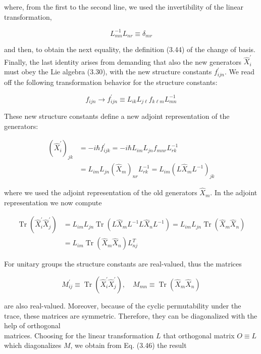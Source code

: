 \documentclass[10pt, letterpaper]{article}
\begin{document}
where, from the first to the second line, we used the invertibility of the linear transformation,

$$
L_{m n}^{-1} L_{n r} \equiv \delta_{m r}
$$

and then, to obtain the next equality, the definition (3.44) of the change of basis. Finally, the last identity arises from demanding that also the new generators $\hat{X}_{i}^{\prime}$ must obey the Lie algebra (3.30), with the new structure constants $f_{i j n}^{\prime}$. We read off the following transformation behavior for the structure constants:

$$
f_{i j n} \longrightarrow f_{i j n}^{\prime} \equiv L_{i k} L_{j \ell} f_{k \ell m} L_{m n}^{-1}
$$

These new structure constants define a new adjoint representation of the generators:

$$
\begin{aligned}
\left(\hat{X}_{i}^{\prime}\right)_{j k} & =-i \hbar f_{i j k}^{\prime}=-i \hbar L_{i m} L_{j n} f_{m n r} L_{r k}^{-1} \\
& =L_{i m} L_{j n}\left(\hat{X}_{m}\right)_{n r} L_{r k}^{-1}=L_{i m}\left(L \hat{X}_{m} L^{-1}\right)_{j k}
\end{aligned}
$$

where we used the adjoint representation of the old generators $\hat{X}_{m}$. In the adjoint representation we now compute

$$
\begin{aligned}
\operatorname{Tr}\left(\hat{X}_{i}^{\prime} \hat{X}_{j}^{\prime}\right) & =L_{i m} L_{j n} \operatorname{Tr}\left(L \hat{X}_{m} L^{-1} L \hat{X}_{n} L^{-1}\right)=L_{i m} L_{j n} \operatorname{Tr}\left(\hat{X}_{m} \hat{X}_{n}\right) \\
& =L_{i m} \operatorname{Tr}\left(\hat{X}_{m} \hat{X}_{n}\right) L_{n j}^{T}
\end{aligned}
$$

For unitary groups the structure constants are real-valued, thus the matrices

$$
M_{i j}^{\prime} \equiv \operatorname{Tr}\left(\hat{X}_{i}^{\prime} \hat{X}_{j}^{\prime}\right), \quad M_{m n} \equiv \operatorname{Tr}\left(\hat{X}_{m} \hat{X}_{n}\right)
$$

are also real-valued. Moreover, because of the cyclic permutability under the trace, these matrices are symmetric. Therefore, they can be diagonalized with the help of orthogonal\\
matrices. Choosing for the linear transformation $L$ that orthogonal matrix $O \equiv L$ which diagonalizes $M$, we obtain from Eq. (3.46) the result
\end{document}
